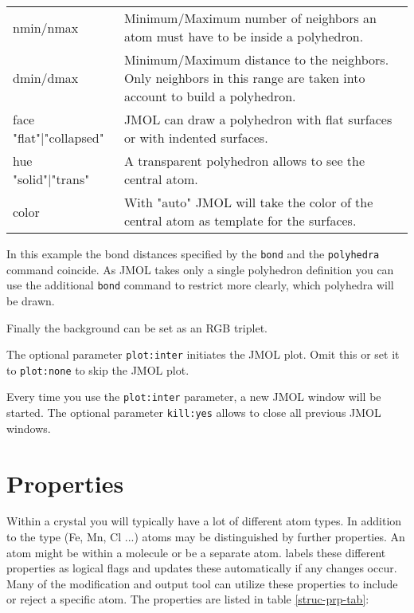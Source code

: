 \begin{tabularx}{\textwidth}{p{40mm}X}
nmin/nmax & Minimum/Maximum number of neighbors an atom must have to 
      be inside a polyhedron.  \\
dmin/dmax & Minimum/Maximum distance to the neighbors. Only neighbors
      in this range are taken into account to build a polyhedron. \\
face {"flat"|"collapsed"} & JMOL can draw a polyhedron with flat surfaces 
      or with indented surfaces. \\
hue {"solid"|"trans"} & A transparent polyhedron allows to see the 
      central atom. \\
color & With "auto" JMOL will take the color of the central atom 
      as template for the surfaces. \\
\end{tabularx}

In this example the bond distances specified by the {\tt bond} and the
{\tt polyhedra} command coincide. As JMOL takes only a single 
polyhedron definition you can use the additional {\tt bond} command to 
restrict more clearly, which polyhedra will be drawn.

Finally the background can be set as an RGB triplet.

The optional parameter {\tt plot:inter} initiates the JMOL plot. Omit this 
or set it to {\tt plot:none} to skip the JMOL plot. 

Every time you use the {\tt plot:inter} parameter, a new JMOL window 
will be started. The optional parameter {\tt kill:yes} allows to
close all previous JMOL windows.


\section{Properties \label{struc-properties}}

Within a crystal you will typically have a lot of different atom types. 
In addition to the type (Fe, Mn, Cl ...) atoms may be distinguished by
further properties. An atom might be within a molecule or be a separate
atom. \Discus labels these different properties as logical flags 
and updates these 
automatically if any changes occur. Many of the modification and output
tool can utilize these properties to include or reject a specific atom.
The properties are listed in table \ref{struc-prp-tab}:

